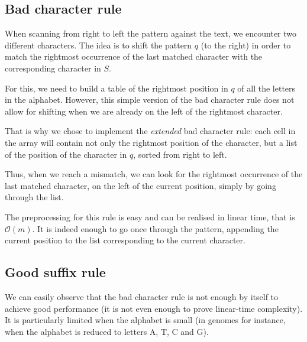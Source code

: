 \documentclass[a4paper,11pt,openany,extrafontsizes,twoside,article]{memoir}
\begin{document}
\subsection{Bad character rule}
\label{sec:bad-character-rule}

When scanning from right to left the pattern against the text, we
encounter two different characters. The idea is to shift the pattern
$q$ (to the right) in order to match the rightmost occurrence of the
last matched character with the corresponding character in $S$.

For this, we need to build a table of the rightmost position in $q$ of
all the letters in the alphabet. However, this simple version of the
bad character rule does not allow for shifting when we are already on
the left of the rightmost character.

That is why we chose to implement the \emph{extended} bad character
rule: each cell in the array will contain not only the rightmost
position of the character, but a list of the position of the character
in $q$, sorted from right to left.

Thus, when we reach a mismatch, we can look for the rightmost
occurrence of the last matched character, on the left of the current
position, simply by going through the list.

The preprocessing for this rule is easy and can be realised in linear
time, that is $\mathcal{O}(m)$. It is indeed enough to go once through the
pattern, appending the current position to the list corresponding to
the current character.

\subsection{Good suffix rule}
\label{sec:good-suffix-rule}

We can easily observe that the bad character rule is not enough by
itself to achieve good performance (it is not even enough to prove
linear-time complexity). It is particularly limited when the alphabet
is small (in genomes for instance, when the alphabet is reduced to
letters A, T, C and G).
\end{document}
